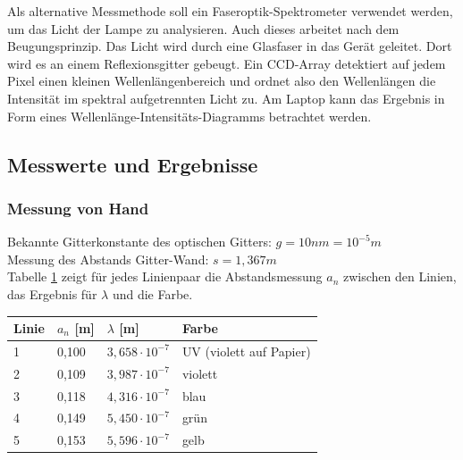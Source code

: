 \documentclass{scrartcl}
\begin{document}
Als alternative Messmethode soll ein Faseroptik-Spektrometer verwendet werden, um das Licht der Lampe zu analysieren. Auch dieses arbeitet nach dem Beugungsprinzip. Das Licht wird durch eine Glasfaser in das Gerät geleitet. Dort wird es an einem Reflexionsgitter gebeugt. Ein CCD-Array detektiert auf jedem Pixel einen kleinen Wellenlängenbereich und ordnet also den Wellenlängen die Intensität im spektral aufgetrennten Licht zu. Am Laptop kann das Ergebnis in Form eines Wellenlänge-Intensitäts-Diagramms betrachtet werden.
\subsection{Messwerte und Ergebnisse}
\subsubsection{Messung von Hand}
Bekannte Gitterkonstante des optischen Gitters: $g = 10nm = 10^{-5}m$ \\
Messung des Abstands Gitter-Wand: $s = 1,367m$ \\
Tabelle \ref{tab:Spektrum1} zeigt für jedes Linienpaar die Abstandsmessung $a_{n}$ zwischen den Linien, das Ergebnis für $\lambda$ und die Farbe.
\begin{table}[H]
\begin{center}
\begin{tabular}{l|l|l|l}
Linie    & $a_{n}$ {[}m{]} & $\lambda$ {[}m{]} & Farbe \\
\hline
1          & 0,100       & $3,658 \cdot 10^{-7}$ & UV (violett auf Papier)\\
2          & 0,109       & $3,987 \cdot 10^{-7}$ & violett \\
3          & 0,118       & $4,316 \cdot 10^{-7}$ & blau    \\
4          & 0,149       & $5,450 \cdot 10^{-7}$ & grün    \\
5          & 0,153       & $5,596 \cdot 10^{-7}$ & gelb    
\end{tabular}
\end{center}
\label{tab:Spektrum1}
\end{table}
\newpage
\end{document}
